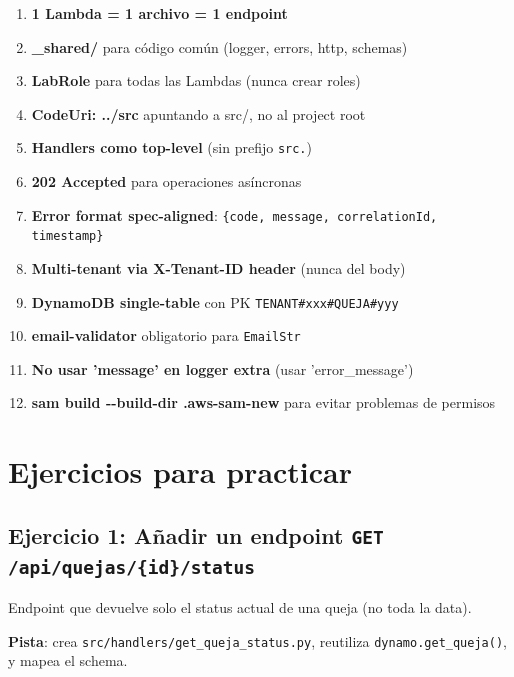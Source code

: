 \documentclass[11pt,a4paper,oneside]{article}
\newcommand{\filename}[1]{\texttt{\small #1}}
\begin{document}
\begin{tcolorbox}[colback=okgreen!5!white,colframe=okgreen,title={\textbf{Checklist Fase 1}}]
\begin{enumerate}
  \item \textbf{1 Lambda = 1 archivo = 1 endpoint}
  \item \textbf{\_shared/} para c\'odigo com\'un (logger, errors, http, schemas)
  \item \textbf{LabRole} para todas las Lambdas (nunca crear roles)
  \item \textbf{CodeUri: ../src} apuntando a src/, no al project root
  \item \textbf{Handlers como top-level} (sin prefijo \texttt{src.})
  \item \textbf{202 Accepted} para operaciones as\'incronas
  \item \textbf{Error format spec-aligned}: \texttt{\{code, message, correlationId, timestamp\}}
  \item \textbf{Multi-tenant via X-Tenant-ID header} (nunca del body)
  \item \textbf{DynamoDB single-table} con PK \texttt{TENANT\#xxx\#QUEJA\#yyy}
  \item \textbf{email-validator} obligatorio para \texttt{EmailStr}
  \item \textbf{No usar 'message' en logger extra} (usar 'error\_message')
  \item \textbf{sam build -{}-build-dir .aws-sam-new} para evitar problemas de permisos
\end{enumerate}
\end{tcolorbox}

\section{Ejercicios para practicar}

\subsection{Ejercicio 1: A\~nadir un endpoint \texttt{GET /api/quejas/\{id\}/status}}

Endpoint que devuelve solo el status actual de una queja (no toda la data).

\textbf{Pista}: crea \filename{src/handlers/get\_queja\_status.py}, reutiliza \texttt{dynamo.get\_queja()}, y mapea el schema.
\end{document}
